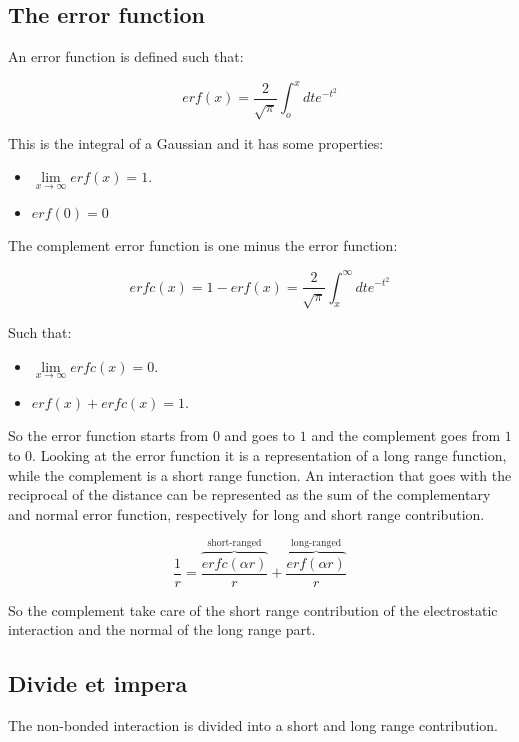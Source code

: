 	\subsection{The error function}
	An error function is defined such that:

	$$erf(x) = \frac{2}{\sqrt{\pi}}\int_o^x dte^{-t^2}$$

	This is the integral of a Gaussian and it has some properties:

	\begin{multicols}{2}
		\begin{itemize}
			\item $\lim\limits_{x\rightarrow \infty}erf(x) = 1$.
			\item $erf(0) = 0$
		\end{itemize}
	\end{multicols}

	The complement error function is one minus the error function:

	$$erfc(x) = 1- erf(x) = \frac{2}{\sqrt{\pi}}\int_x^\infty dte^{-t^2}$$

	Such that:

	\begin{multicols}{2}
		\begin{itemize}
			\item $\lim\limits_{x\rightarrow\infty} erfc(x) = 0$.
			\item $erf(x) + erfc(x) = 1$.
		\end{itemize}
	\end{multicols}

	So the error function starts from $0$ and goes to $1$ and the complement goes from $1$ to $0$.
	Looking at the error function it is a representation of a long range function, while the complement is a short range function.
	An interaction that goes with the reciprocal of the distance can be represented as the sum of the complementary and normal error function, respectively for long and short range contribution.

	$$\frac{1}{r} = \overbrace{\frac{erfc(\alpha r)}{r}}^{\text{short-ranged}} + \overbrace{\frac{erf(\alpha r)}{r}}^{\text{long-ranged}}$$

	So the complement take care of the short range contribution of the electrostatic interaction and the normal of the long range part.

	\subsection{Divide et impera}
	The non-bonded interaction is divided into a short and long range contribution.

